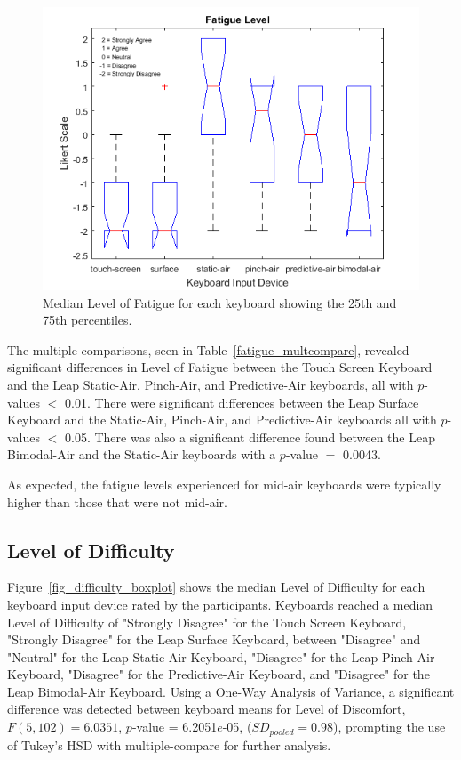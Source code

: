 \begin{figure}[h]
	\centering
	\includegraphics{fig_fatigue_boxplot}
	\caption[Level of Fatigue Boxplot]{Median Level of Fatigue for each keyboard showing the 25th and 75th percentiles.}
	\label{fig_fatigue_boxplot}
\end{figure}

The multiple comparisons, seen in Table~\ref{fatigue_multcompare}, revealed significant differences in Level of Fatigue between the Touch Screen Keyboard and the Leap Static-Air, Pinch-Air, and Predictive-Air keyboards, all with $p$-values $<$ 0.01. There were significant differences between the Leap Surface Keyboard and the Static-Air, Pinch-Air, and Predictive-Air keyboards all with $p$-values $<$ 0.05. There was also a significant difference found between the Leap Bimodal-Air and the Static-Air keyboards with a $p$-value $=$ 0.0043.

As expected, the fatigue levels experienced for mid-air keyboards were typically higher than those that were not mid-air.

\subsection{Level of Difficulty}
Figure~\ref{fig_difficulty_boxplot} shows the median Level of Difficulty for each keyboard input device rated by the participants. Keyboards reached a median Level of Difficulty of "Strongly Disagree" for the Touch Screen Keyboard, "Strongly Disagree" for the Leap Surface Keyboard, between "Disagree" and "Neutral" for the Leap Static-Air Keyboard, "Disagree" for the Leap Pinch-Air Keyboard, "Disagree" for the Predictive-Air Keyboard, and "Disagree" for the Leap Bimodal-Air Keyboard. Using a One-Way Analysis of Variance, a significant difference was detected between keyboard means for Level of Discomfort, $F(5, 102) = 6.0351$, $p$-value = 6.2051$e$-05, ($SD_{pooled} = 0.98$), prompting the use of Tukey's HSD with multiple-compare for further analysis.


